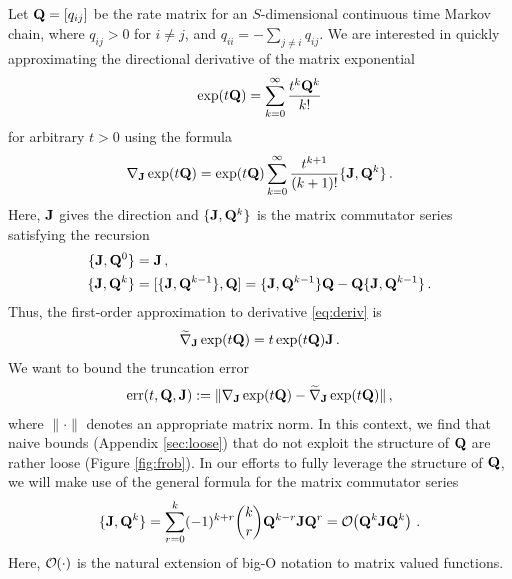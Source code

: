 \documentclass[12pt]{article} %
\newcommand{\order}[1]{{\cal O}\hspace{-0.2em}\left( #1 \right)}
\begin{document}
Let $\mathbf{Q}=[q_{ij}]$ be the rate matrix for an $S$-dimensional continuous time Markov chain, where $q_{ij}>0$ for $i\neq j$, and $q_{ii} = -\sum_{j\neq i} q_{ij}$.  We are interested in quickly approximating the directional derivative of the matrix exponential
\begin{align*}
	\exp(t\mathbf{Q}) = \sum_{k=0}^\infty \frac{t^k\mathbf{Q}^k}{k!}
\end{align*}
for arbitrary $t>0$ using the formula \citep{najfeld1995derivatives}
\begin{align}\label{eq:deriv}
	\nabla_{\mathbf{J}} \exp(t\mathbf{Q})  =  \exp(t\mathbf{Q})  \sum_{k=0}^\infty \frac{t^{k+1}}{(k+1)!} \{\mathbf{J},\mathbf{Q}^k\} \, .
\end{align}
Here, $\mathbf{J}$ gives the direction and $\{\mathbf{J},\mathbf{Q}^k\}$ is the matrix commutator series satisfying the recursion
\begin{align*}
	\{\mathbf{J},\mathbf{Q}^0\} &= \mathbf{J} \, , \\ 
	\{\mathbf{J},\mathbf{Q}^k\} &= [\{\mathbf{J},\mathbf{Q}^{k-1}\} , \mathbf{Q}]  = \{\mathbf{J},\mathbf{Q}^{k-1}\} \mathbf{Q} - \mathbf{Q} \{\mathbf{J},\mathbf{Q}^{k-1}\} \, .
\end{align*}
Thus, the first-order approximation to derivative \eqref{eq:deriv} is 
\begin{align}\label{eq:firstOrder}
	\widetilde{\nabla}_{\mathbf{J}} \exp(t\mathbf{Q})= t \exp(t\mathbf{Q})\mathbf{J} \, .
\end{align}
We want to bound the truncation error
\begin{align*}
\mbox{err}(t,\mathbf{Q},\mathbf{J})	:=\lVert \nabla_{\mathbf{J}} \exp(t\mathbf{Q}) - \widetilde{\nabla}_{\mathbf{J}} \exp(t\mathbf{Q}) \rVert \, ,
\end{align*}
 where $\lVert \cdot \rVert$ denotes an appropriate matrix norm.  In this context, we find that naive bounds (Appendix \ref{sec:loose}) that do not exploit the structure of $\mathbf{Q}$  are rather loose (Figure \ref{fig:frob}).  
 In our efforts to fully leverage the structure of $\mathbf{Q}$, we will make use of the general formula for the matrix commutator series  \citep{volkin1968iterated}
\begin{align}\label{eq:commSeries}
	\{ \JJ, \QQ^k\} = \sum_{r=0}^k (-1)^{k+r}  {k \choose r} \QQ^{k-r} \JJ \QQ^r  = \order{\QQ^k \JJ \QQ^k} \, .
\end{align}
Here, $\order{\cdot}$ is the natural extension of big-O notation to matrix valued functions.
\end{document}
